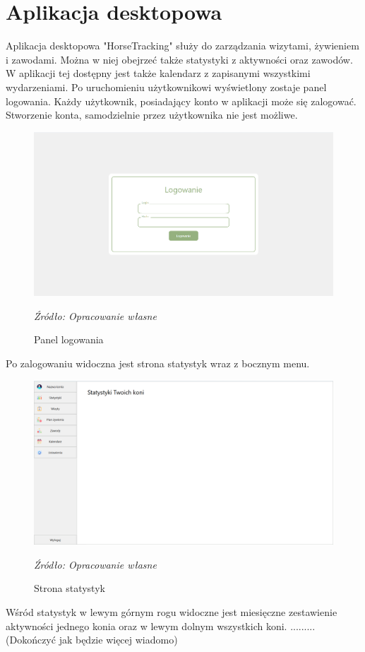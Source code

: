 \documentclass[12pt,oneside]{report}
\begin{document}
\section{Aplikacja desktopowa}
Aplikacja desktopowa "HorseTracking" służy do zarządzania wizytami, żywieniem i zawodami. Można w niej obejrzeć także statystyki z aktywności oraz zawodów. W aplikacji tej dostępny jest także kalendarz z zapisanymi wszystkimi wydarzeniami. Po uruchomieniu użytkownikowi wyświetlony zostaje panel logowania. Każdy użytkownik, posiadający konto w aplikacji może się zalogować. Stworzenie konta, samodzielnie przez użytkownika nie jest możliwe.
\begin{figure}[H]
	\centering
	\includegraphics[scale=0.32]{Logowanie}
	\caption{Panel logowania}
	\textit{Źródło: Opracowanie własne}
	\label{Logowanie}
\end{figure}
Po zalogowaniu widoczna jest strona statystyk wraz z bocznym menu. 
\begin{figure}[H]
\centering
\includegraphics[scale=0.4]{Statystyki}
\caption{Strona statystyk}
\textit{Źródło: Opracowanie własne}
\label{Statystyki}
\end{figure}
Wśród statystyk w lewym górnym rogu widoczne jest miesięczne zestawienie aktywności jednego konia oraz w lewym dolnym wszystkich koni. .........(Dokończyć jak będzie więcej wiadomo)
\end{document}
